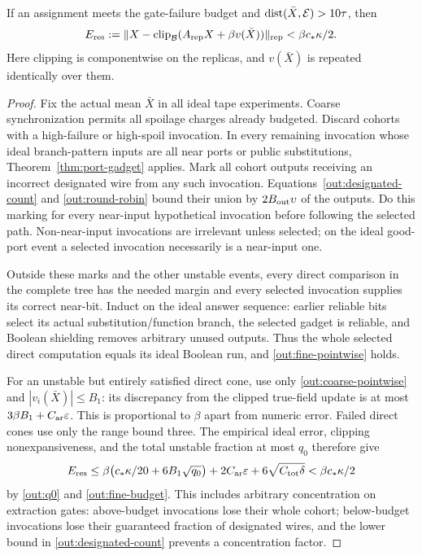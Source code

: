 \begin{lemma}\label{out:fine-residual}
If an assignment meets the gate-failure budget and
$\operatorname{dist}(\bar X,\mathcal E)>10\tau$, then
\begin{equation}\label{out:residual}
 E_{\rm res}:=
 \lVert X-\operatorname{clip}_{\mathcal B}(A_{\rm rep}X+\beta v(\bar X))\rVert_{\rm rep}
                  <\beta c_*\kappa/2.
\end{equation}
Here clipping is componentwise on the replicas, and $v(\bar X)$ is
repeated identically over them.
\end{lemma}
\begin{proof}
Fix the actual mean $\bar X$ in all ideal tape experiments. Coarse
synchronization permits all spoilage charges already budgeted. Discard
cohorts with a high-failure or high-spoil invocation. In every remaining
invocation whose ideal branch-pattern inputs are all near ports or
public substitutions, Theorem~\ref{thm:port-gadget} applies. Mark all
cohort outputs receiving an incorrect designated wire from any such
invocation. Equations~\eqref{out:designated-count} and
\eqref{out:round-robin} bound their union by
$2B_{\rm out}\upsilon$ of the outputs. Do this marking for every
near-input hypothetical invocation before following the selected path.
Non-near-input invocations are irrelevant unless selected; on the ideal
good-port event a selected invocation necessarily is a near-input one.

Outside these marks and the other unstable events, every direct
comparison in the complete tree has the needed margin and every
selected invocation supplies its correct near-bit. Induct on the
ideal answer sequence: earlier reliable bits select its actual
substitution/function branch, the selected gadget is reliable, and
Boolean shielding removes arbitrary unused outputs. Thus the whole
selected direct computation equals its ideal Boolean run, and
\eqref{out:fine-pointwise} holds.

For an unstable but entirely satisfied direct cone, use only
\eqref{out:coarse-pointwise} and $|v_i(\bar X)|\leq B_1$:
its discrepancy from the clipped true-field update is at most
$3\beta B_1+C_{\rm ar}\varepsilon$. This is proportional to $\beta$ apart
from numeric error. Failed direct cones use only the range bound three.
The empirical ideal error, clipping nonexpansiveness, and the total
unstable fraction at most $q_0$ therefore give
\[
 E_{\rm res}
 \leq\beta\bigl(c_*\kappa/20+6B_1\sqrt{q_0}\bigr)
      +2C_{\rm ar}\varepsilon+6\sqrt{C_{\rm tot}\delta}
 <\beta c_*\kappa/2
\]
by \eqref{out:q0} and \eqref{out:fine-budget}. This includes arbitrary
concentration on extraction gates: above-budget invocations lose their
whole cohort; below-budget invocations lose their guaranteed fraction
of designated wires, and the lower bound in
\eqref{out:designated-count} prevents a concentration factor.
\end{proof}

